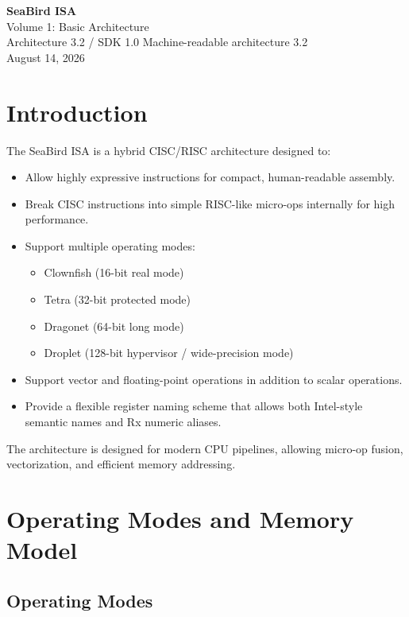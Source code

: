 \documentclass[11pt]{article}
\begin{document}
\begin{titlepage}\centering\vspace*{2cm}
{\Huge\bfseries SeaBird ISA\\[0.3cm]}{\LARGE Volume 1: Basic Architecture\\[0.5cm]}
{\Large Architecture 3.2 / SDK 1.0}\vfill
{\large Machine-readable architecture 3.2\\August 14, 2026}\vfill
\end{titlepage}
\tableofcontents\clearpage
\section{Introduction}

The SeaBird ISA is a hybrid CISC/RISC architecture designed to:

\begin{itemize}
    \item Allow highly expressive instructions for compact, human-readable assembly.
    \item Break CISC instructions into simple RISC-like micro-ops internally for high performance.
    \item Support multiple operating modes:
    \begin{itemize}
        \item Clownfish (16-bit real mode)
        \item Tetra (32-bit protected mode)
        \item Dragonet (64-bit long mode)
        \item Droplet (128-bit hypervisor / wide-precision mode)
    \end{itemize}
    \item Support vector and floating-point operations in addition to scalar operations.
    \item Provide a flexible register naming scheme that allows both Intel-style semantic names and Rx numeric aliases.
\end{itemize}

The architecture is designed for modern CPU pipelines, allowing micro-op fusion, vectorization, and efficient memory addressing.

\section{Operating Modes and Memory Model}

\subsection{Operating Modes}
\end{document}
